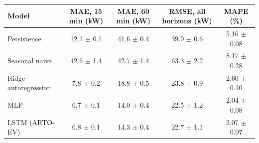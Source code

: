 \begin{tabular}{@{}lcccc@{}}
\toprule
Model & MAE, 15 min (kW) & MAE, 60 min (kW) & RMSE, all horizons (kW) & MAPE (\%) \\
\midrule
Persistence & 12.1 $\pm$ 0.1 & 41.6 $\pm$ 0.4 & 39.9 $\pm$ 0.6 & 5.16 $\pm$ 0.08 \\
Seasonal naive & 42.6 $\pm$ 1.4 & 42.7 $\pm$ 1.4 & 63.3 $\pm$ 2.2 & 8.17 $\pm$ 0.28 \\
Ridge autoregression & 7.8 $\pm$ 0.2 & 18.8 $\pm$ 0.5 & 23.8 $\pm$ 0.9 & 2.60 $\pm$ 0.10 \\
MLP & 6.7 $\pm$ 0.1 & 14.0 $\pm$ 0.4 & 22.5 $\pm$ 1.2 & 2.04 $\pm$ 0.08 \\
LSTM (ARTO-EV) & 6.8 $\pm$ 0.1 & 14.3 $\pm$ 0.4 & 22.7 $\pm$ 1.1 & 2.07 $\pm$ 0.07 \\
\bottomrule
\end{tabular}